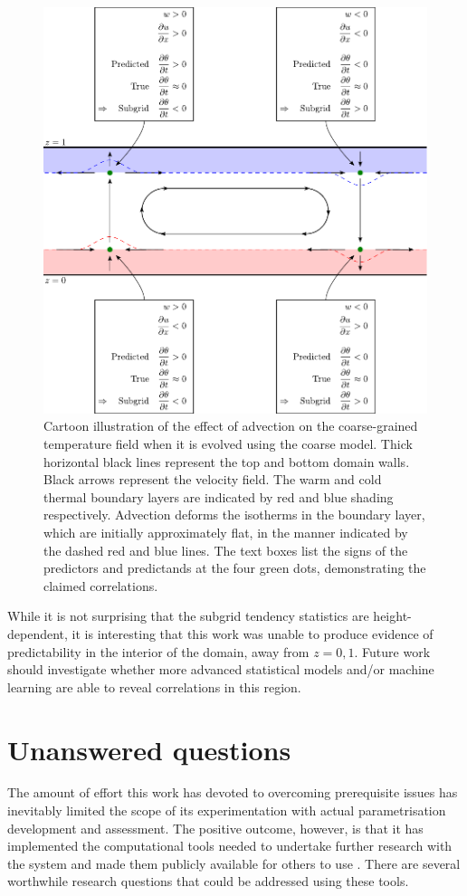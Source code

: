 \documentclass[../main.tex]{subfiles}
\begin{document}
\begin{figure}[ht]
    \centering
    \includegraphics[width=0.8\linewidth]{figures/tendency_explanation.pdf}
    \caption{
        Cartoon illustration of the effect of advection on the coarse-grained
        temperature field when it is evolved using the coarse model. Thick
        horizontal black lines represent the top and bottom domain walls. Black
        arrows represent the velocity field. The warm and cold thermal boundary
        layers are indicated by red and blue shading respectively. Advection
        deforms the isotherms in the boundary layer, which are initially
        approximately flat, in the manner indicated by the dashed red and blue
        lines. The text boxes list the signs of the predictors and predictands
        at the four green dots, demonstrating the claimed correlations.
    }
    \label{fig:tendency_explanation}
\end{figure}

While it is not surprising that the subgrid tendency statistics are
height-dependent, it is interesting that this work was unable to produce
evidence of predictability in the interior of the domain, away from $z=0,1$.
Future work should investigate whether more advanced statistical models and/or
machine learning are able to reveal correlations in this region.


\section{Unanswered questions}
The amount of effort this work has devoted to overcoming prerequisite issues
has inevitably limited the scope of its experimentation with actual
parametrisation development and assessment. The positive outcome, however, is
that it has implemented the computational tools needed to undertake further
research with the \rb{} system and made them publicly available for others to
use . There are several worthwhile research
questions that could be addressed using these tools.
\end{document}
